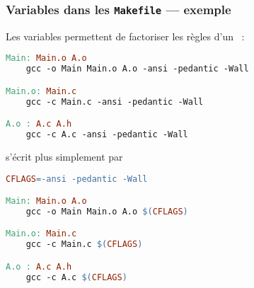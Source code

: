 \begin{frame}[fragile]
\frametitle{Variables dans les {\tt Makefile} --- exemple}

Les variables permettent de factoriser les règles d'un ~:
\medskip

\begin{lstlisting}[language=make,basicstyle=\footnotesize\tt]
Main: Main.o A.o
    gcc -o Main Main.o A.o -ansi -pedantic -Wall

Main.o: Main.c
    gcc -c Main.c -ansi -pedantic -Wall

A.o : A.c A.h
    gcc -c A.c -ansi -pedantic -Wall
\end{lstlisting}
\medskip

s'écrit plus simplement par
\medskip

\begin{lstlisting}[language=make,basicstyle=\footnotesize\tt]
CFLAGS=-ansi -pedantic -Wall

Main: Main.o A.o
    gcc -o Main Main.o A.o $(CFLAGS)

Main.o: Main.c
    gcc -c Main.c $(CFLAGS)

A.o : A.c A.h
    gcc -c A.c $(CFLAGS)
\end{lstlisting}
\begin{math}\end{math}
\end{frame}

